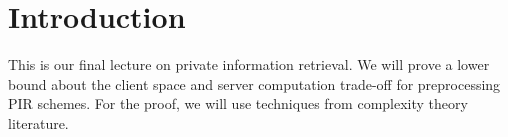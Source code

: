 
\newcommand{\bits}{\{0,1\}}
\newcommand{\bfu}{\mathbf{u}}
\newcommand{\bfv}{\mathbf{v}}
\newcommand{\bfp}{\mathbf{p}}
\newcommand{\bfz}{\mathbf{z}}
\newcommand{\bfx}{\mathbf{x}}
\newcommand{\bfy}{\mathbf{y}}

\newcommand{\calR}{\mathcal{R}}
\newcommand{\FHE}{\ensuremath{{\sf FHE}}}
\newcommand{\Gen}{\ensuremath{{\sf Gen}}}
\newcommand{\Eval}{\ensuremath{{\sf Eval}}}
\newcommand{\Enc}{\ensuremath{{\sf Enc}}}
\newcommand{\Dec}{\ensuremath{{\sf Dec}}}
\newcommand{\DB}{\ensuremath{{\sf DB}}}

\newcommand{\CNextMsg}{\ensuremath{{\sf C Next Msg}}}
\newcommand{\SNextMsg}{\ensuremath{{\sf S Next Msg}}}
\newcommand{\CNext}{\ensuremath{{\sf C Next}}}
\newcommand{\SNext}{\ensuremath{{\sf S Next}}}
\newcommand{\Cstp}{\ensuremath{{\sf Cst'}}}
\newcommand{\Cst}{\ensuremath{{\sf Cst}}}
\newcommand{\msg}{\ensuremath{{\sf msg}}}
\newcommand{\msgp}{\ensuremath{{\sf msg'}}}
\newcommand{\Coutput}{\ensuremath{{\sf Reconstr}}}
\newcommand{\ans}{\ensuremath{{\sf ans}}}
\newcommand{\Ccoins}{\ensuremath{{\sf Ccoins}}}
\newcommand{\Scoins}{\ensuremath{{\sf Scoins}}}
\newcommand{\Comm}{\ensuremath{{\sf Comm}}}
\newcommand{\Expt}{\ensuremath{{\sf Expt}}}
\newcommand{\coin}{\ensuremath{{\sf coin}}}
\newcommand{\View}{\ensuremath{{\sf View}}}
\newcommand{\negl}{\ensuremath{{\sf negl}}}
\newcommand{\PPT}{PPT }
\newcommand{\Out}{\ensuremath{{\sf Out}}}
\newcommand{\OWF}{\ensuremath{{\sf OWF}}}
\newcommand{\OT}{\ensuremath{{\sf OT}}}
\newcommand{\PIR}{\ensuremath{{\sf PIR}}}
\newcommand{\Server}{\ensuremath{{\sf Server}}}
\newcommand{\Client}{\ensuremath{{\sf Client}}}
\newcommand{\Alice}{\ensuremath{{\sf Alice}}}
\newcommand{\Bob}{\ensuremath{{\sf Bob}}}
\newcommand{\getr}{\ensuremath{~{\overset{\$}{\leftarrow}}}~}
\newcommand{\get}{\ensuremath{\leftarrow}}
\newcommand{\E}{\ensuremath{{\bf E}}}
\newcommand{\out}{\ensuremath{{\sf out}}}
\newcommand{\PRF}{\ensuremath{{\sf PRF}}}
\newcommand{\prob}{\ensuremath{\mathbb{P}}}

\newcommand{\ignore}[1]{}

\setlength{\parindent}{0pt}
\section{Introduction}
This is our final lecture on private information retrieval. We will prove a lower bound about the client space and server computation trade-off for preprocessing PIR schemes. For the proof, we will use techniques from complexity theory literature.

